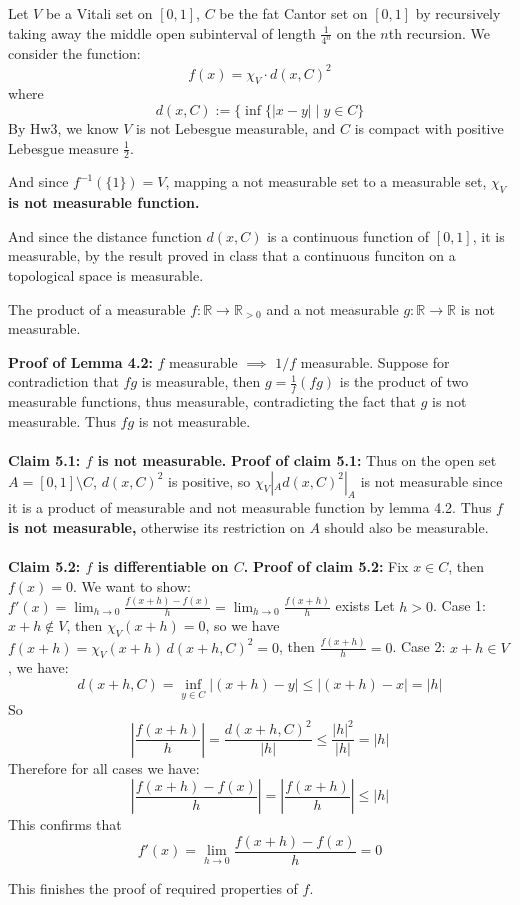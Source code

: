 \documentclass[lang=cn,11pt]{elegantbook}
\begin{document}
\begin{solution}
Let $V$ be a Vitali set on $[0,1]$, $C$ be the fat Cantor set on $[0,1]$ by recursively taking away the middle open subinterval of length $\frac{1}{4^{n}}$ on the $n$th recursion. 
    We consider the function: \[ f(x) = \chi_V \cdot d(x,C)^2\]
where \[d(x,C) := \{\inf\{|x-y|\mid y\in C\}\]
By Hw3, we know $V$ is not Lebesgue measurable, and $C$ is compact with positive Lebesgue measure $\frac{1}{2}$.

And since $f^{-1} (\{1\}) = V$, mapping a not measurable set to a measurable set, \textbf{$\chi_V$ is not measurable function. }

And since the distance function $d(x,C)$ is a continuous function of $[0,1]$, it is measurable, by the result proved in class that a continuous funciton on a topological space is measurable.

\begin{lemma}
The product of a measurable $f:\mathbb{R}\rightarrow \mathbb{R}_{>0}$ and a not measurable $g: \mathbb{R}\rightarrow \mathbb{R}$ is not measurable.
\end{lemma}

\noindent \textbf{Proof of Lemma 4.2: } 
$f$ measurable $\implies$ $1/f$ measurable. Suppose for contradiction that $fg$ is measurable, then  $g = \frac{1}{f}(f g) $ is the product of two measurable functions, thus measurable, contradicting the fact that $g$ is not measurable. Thus $fg$ is not measurable.\\\\

\noindent \textbf{Claim 5.1: $f$ is not measurable.}
\noindent \textbf{Proof of claim 5.1:}
Thus on the open set $A = [0,1] \setminus C$, $d(x,C)^2$ is positive, so $\chi_V |_A d(x,C)^2|_A $  is not measurable since it is a product of measurable and not measurable function by lemma 4.2. Thus\textbf{ $f$ is not measurable,} otherwise its restriction on $A$ should also be measurable.\\\\

\noindent \textbf{Claim 5.2: $f$ is differentiable on $C$.}
\textbf{Proof of claim 5.2:} 
Fix \(x\in C\), then $f(x) = 0$. We want to show:\(f'(x)=\lim_{h\to 0}\frac{f(x+h)-f(x)}{h} = \lim_{h\to 0}\frac{f(x+h)}{h}\) exists
Let $h > 0$.
Case 1: \(x+h\notin V\), then \(\chi_V(x+h)=0\), so we have \(f(x+h)=\chi_V(x+h)\,d(x+h,C)^2=0
  \), then 
  \(\frac{f(x+h)}{h}=0\). 
Case 2: \(x+h\in V\), we have: \[
  d(x+h,C)=\inf_{y\in C}|(x+h)-y|\le |(x+h)-x|=|h|
  \] So  \[
  \left|\frac{f(x+h)}{h}\right|=\frac{d(x+h,C)^2}{|h|}\le\frac{|h|^2}{|h|}=|h|
  \]
Therefore for all cases we have:
\[
\left|\frac{f(x+h)-f(x)}{h}\right|=\left|\frac{f(x+h)}{h}\right|\le |h|
\]
This confirms that 
\[
f'(x)=\lim_{h\to 0}\frac{f(x+h)-f(x)}{h}=0
\]

This finishes the proof of required properties of $f$.
\end{solution}
\end{document}
